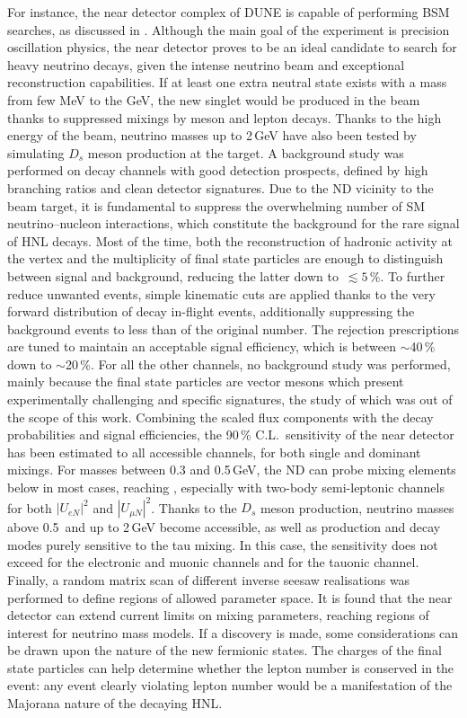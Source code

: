 For instance, the near detector complex of DUNE is capable of performing BSM searches, %
as discussed in .
Although the main goal of the experiment is precision oscillation physics, %
the near detector proves to be an ideal candidate to search for heavy neutrino decays, %
given the intense neutrino beam and exceptional reconstruction capabilities.
If at least one extra neutral state exists with a mass from few MeV to the GeV, %
the new singlet would be produced in the beam thanks to suppressed mixings by meson and lepton decays.
Thanks to the high energy of the beam, neutrino masses up to 2\,GeV have also been tested %
by simulating $D_s$ meson production at the target.
A background study was performed on decay channels with good detection prospects, %
defined by high branching ratios and clean detector signatures.
Due to the ND vicinity to the beam target, it is fundamental to suppress the overwhelming %
number of SM neutrino--nucleon interactions, which constitute the background for the rare signal of HNL decays.
Most of the time, both the reconstruction of hadronic activity at the vertex %
and the multiplicity of final state particles are enough to distinguish between signal and background, %
reducing the latter down to~$\lesssim5$\,\%.
To further reduce unwanted events, simple kinematic cuts are applied thanks to the very forward distribution of %
decay in-flight events, additionally suppressing the background events to less than  of the original number.
The rejection prescriptions are tuned to maintain an acceptable signal efficiency, which is between $\sim$40\,\% down to $\sim$20\,\%.
For all the other channels, no background study was performed, mainly because the final state particles %
are vector mesons which present experimentally challenging and specific signatures, the study of which %
was out of the scope of this work.
Combining the scaled flux components with the decay probabilities and signal efficiencies, %
the 90\,\% C.L.\ sensitivity of the near detector has been estimated to all accessible channels, %
for both single and dominant mixings.
For masses between 0.3 and 0.5\,GeV, the ND can probe mixing elements below  in most cases, %
reaching , especially with two-body semi-leptonic channels for both $|U_{e N}|^2$ and $|U_{\mu N}|^2$.
Thanks to the $D_s$ meson production, neutrino masses above 0.5\, and up to 2\,GeV become accessible, %
as well as production and decay modes purely sensitive to the tau mixing.
In this case, the sensitivity does not exceed  for the electronic and muonic channels and %
 for the tauonic channel.
Finally, a random matrix scan of different inverse seesaw realisations was performed %
to define regions of allowed parameter space.
It is found that the near detector can extend current limits on mixing parameters, %
reaching regions of interest for neutrino mass models.
If a discovery is made, some considerations can be drawn upon the nature of the new fermionic states.
The charges of the final state particles can help determine whether the lepton number %
is conserved in the event: any event clearly violating lepton number would be a manifestation of %
the Majorana nature of the decaying HNL.


